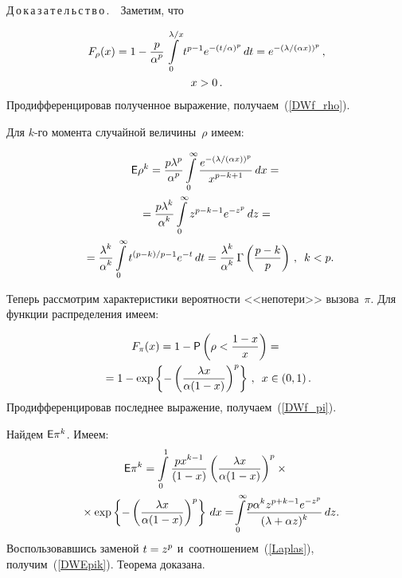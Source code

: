 \begin{multicols}{2}
\noindent
Д\,о\,к\,а\,з\,а\,т\,е\,л\,ь\,с\,т\,в\,о\,.\ \ Заметим, что

\noindent
\begin{multline*}
F_\rho(x) = 1 - \displaystyle\frac{\displaystyle p\mathstrut}{\displaystyle \alpha^p\mathstrut}\int\limits_0^{\lambda/x}t^{p-1}e^{-(t/\alpha)^{p}}\, dt 
= e^{-\left(\lambda/(\alpha x)\right)^{p}}\,, \\
 x>0\,.
\end{multline*}
Продифференцировав полученное выражение, получаем~(\ref{DWf_rho}).


Для $k$-го момента случайной величины~$\rho$ имеем:

\noindent
\begin{multline*}
{\sf E}\rho^k=\displaystyle\frac{\displaystyle p\lambda^{p}\mathstrut}{\displaystyle {\alpha^{p}}\mathstrut}\int\limits_0^{\infty}
\displaystyle\frac{\displaystyle e^{-(\lambda/(\alpha x))^{p}}\mathstrut}{\displaystyle {x^{p-k+1}}\mathstrut}\,dx={}\\
{}=
\displaystyle\frac{\displaystyle p\lambda^k\mathstrut}{\displaystyle \alpha^k\mathstrut}\int\limits_0^{\infty}z^{p-k-1}e^{-z^{p}}\,dz={}\\
{} = \displaystyle\frac{\displaystyle \lambda^k\mathstrut}{\displaystyle \alpha^k\mathstrut}\int\limits_0^{\infty}t^{(p-k)/p-1}e^{-t}\,dt = 
\displaystyle\frac{\displaystyle \lambda^k\mathstrut}{\displaystyle \alpha^k\mathstrut}\,\Gamma\left(\displaystyle\frac{\displaystyle p-k\mathstrut}{\displaystyle p\mathstrut}\right)\,, \enskip k<p.\hspace*{-3.8pt}
\end{multline*}

Теперь рассмотрим характеристики вероятности <<непотери>> вызова~$\pi$. 
Для функции распределения имеем:

\noindent
\begin{multline*}
F_\pi(x) = 1 - {\sf P}\left(\rho<\displaystyle\frac{\displaystyle 1-x\mathstrut}{\displaystyle x\mathstrut}\right) = {}\\
{}=
1 - \exp\left\lbrace -\left(\displaystyle\frac{\displaystyle \lambda x\mathstrut}{\displaystyle \alpha(1-x)\mathstrut}\right)^p\right\rbrace \,, \enskip
x\in(0,1)\,.
\end{multline*}
Продифференцировав последнее выражение, получаем~(\ref{DWf_pi}).



Найдем ${\sf E}\pi^k$. Имеем:
\begin{multline*}
{\sf E}\pi^k = \int\limits_0^{1}\displaystyle\frac{\displaystyle px^{k-1}\mathstrut}{\displaystyle (1-x)\mathstrut}
\left(\displaystyle\frac{\displaystyle \lambda x\mathstrut}{\displaystyle \alpha(1-x)\mathstrut}\right)^p \times{}\\
{}\times\exp\left\lbrace -\left(\displaystyle\frac{\displaystyle \lambda x\mathstrut}{\displaystyle \alpha(1-x)\mathstrut}\right)^p\right\rbrace \, dx=
\! \int\limits_0^{\infty}\!\displaystyle\frac{\displaystyle p\alpha^k z^{p+k-1} 
e^{-z^p}\mathstrut}{\displaystyle (\lambda + \alpha z)^k\mathstrut}\,dz.\hspace*{-6.55pt}
\end{multline*}
Воспользовавшись заменой $t\hm=z^p$  и~соотношением~(\ref{Laplas}), 
получим~(\ref{DWEpik}).
Теорема доказана.

\smallskip


\end{multicols}
